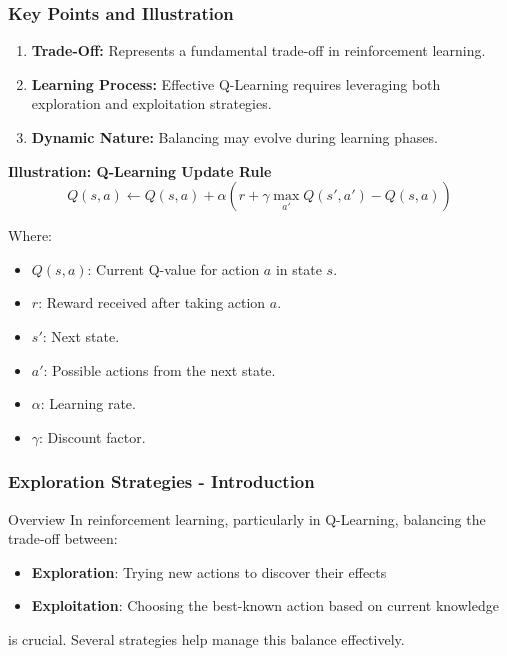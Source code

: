 \documentclass[aspectratio=169]{beamer}
\begin{document}
\begin{frame}[fragile]
    \frametitle{Key Points and Illustration}
    \begin{enumerate}
        \item \textbf{Trade-Off:} Represents a fundamental trade-off in reinforcement learning.
        \item \textbf{Learning Process:} Effective Q-Learning requires leveraging both exploration and exploitation strategies.
        \item \textbf{Dynamic Nature:} Balancing may evolve during learning phases.
    \end{enumerate}

    \textbf{Illustration: Q-Learning Update Rule} 
    \begin{equation}
    Q(s, a) \leftarrow Q(s, a) + \alpha \left( r + \gamma \max_{a'} Q(s', a') - Q(s, a) \right)
    \end{equation}
    
    Where: 
    \begin{itemize}
        \item $Q(s, a)$: Current Q-value for action $a$ in state $s$.
        \item $r$: Reward received after taking action $a$.
        \item $s'$: Next state.
        \item $a'$: Possible actions from the next state.
        \item $\alpha$: Learning rate.
        \item $\gamma$: Discount factor.
    \end{itemize}
\end{frame}

\begin{frame}[fragile]
    \frametitle{Exploration Strategies - Introduction}
    \begin{block}{Overview}
        In reinforcement learning, particularly in Q-Learning, balancing the trade-off between:
        \begin{itemize}
            \item \textbf{Exploration}: Trying new actions to discover their effects
            \item \textbf{Exploitation}: Choosing the best-known action based on current knowledge
        \end{itemize}
        is crucial. Several strategies help manage this balance effectively.
    \end{block}
\end{frame}
\end{document}
